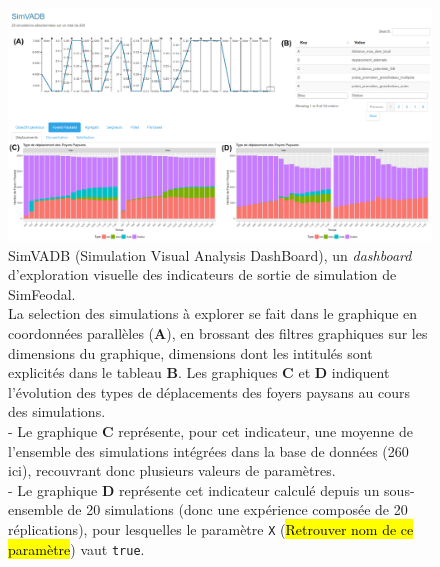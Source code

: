 	\begin{figure}[H]
		\captionsetup{width=\linewidth}
		\includegraphics[width=\linewidth]{img/SimVADB_Dashboard2_annote.png}
		\caption{SimVADB (Simulation Visual Analysis DashBoard), un \textit{dashboard} d'exploration visuelle des indicateurs de sortie de simulation de SimFeodal.\\
		La selection des simulations à explorer se fait dans le graphique en coordonnées parallèles (\textbf{A}), en \og brossant\fg{} des filtres graphiques sur les \og dimensions\fg{} du graphique, dimensions dont les intitulés sont explicités dans le tableau \textbf{B}.
		Les graphiques \textbf{C} et \textbf{D} indiquent l'évolution des types de déplacements des foyers paysans au cours des simulations.\\
		- Le graphique \textbf{C} représente, pour cet indicateur, une moyenne de l'ensemble des simulations intégrées dans la base de données (260 ici), recouvrant donc plusieurs valeurs de paramètres.\\
		- Le graphique \textbf{D} représente cet indicateur calculé depuis un sous-ensemble de 20 simulations (donc une expérience composée de 20 réplications), pour lesquelles le paramètre \og \texttt{X} \fg{}(\hl{Retrouver nom de ce paramètre}) vaut \texttt{true}.}
		\label{fig:simvadb_dashboard}
	\end{figure}

